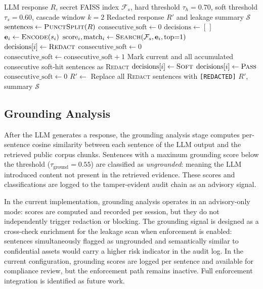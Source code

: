 \documentclass[journal]{IEEEtran}
\begin{document}
\begin{algorithm}[!ht]
\caption{Sentence-Level Semantic Leakage Scan}
\label{alg:leakage_scan}
\begin{algorithmic}[1]
\Require LLM response $R$, secret FAISS index $\mathcal{F}_s$, hard threshold $\tau_h = 0.70$, soft threshold $\tau_s = 0.60$, cascade window $k = 2$
\Ensure Redacted response $R'$ and leakage summary $\mathcal{S}$
\State $\text{sentences} \gets \textsc{PunctSplit}(R)$ 
\State $\text{consecutive\_soft} \gets 0$
\State $\text{decisions} \gets [\,]$
    \State $\mathbf{e}_i \gets \textsc{Encode}(s_i)$ 
    \State $\text{score}_i, \text{match}_i \gets \textsc{Search}(\mathcal{F}_s, \mathbf{e}_i, \text{top}{=}1)$
        \State $\text{decisions}[i] \gets \textsc{Redact}$ 
        \State $\text{consecutive\_soft} \gets 0$
        \State $\text{consecutive\_soft} \gets \text{consecutive\_soft} + 1$
            \State Mark current and all accumulated consecutive soft-hit sentences as \textsc{Redact}
        \Else
            \State $\text{decisions}[i] \gets \textsc{Soft}$
        \EndIf
    \Else
        \State $\text{decisions}[i] \gets \textsc{Pass}$
        \State $\text{consecutive\_soft} \gets 0$
    \EndIf
\EndFor
\State $R' \gets$ Replace all \textsc{Redact} sentences with \texttt{[REDACTED]}
\State \Return $R'$, summary $\mathcal{S}$
\end{algorithmic}
\end{algorithm}


\subsection{Grounding Analysis}
\label{Sect:Grounding_Validation}

After the LLM generates a response, the grounding analysis stage computes per-sentence cosine similarity between each sentence of the LLM output and the retrieved public corpus chunks. Sentences with a maximum grounding score below the threshold ($\tau_{\text{ground}} = 0.55$) are classified as \textit{ungrounded}: meaning the LLM introduced content not present in the retrieved evidence. These scores and classifications are logged to the tamper-evident audit chain as an advisory signal.

In the current implementation, grounding analysis operates in an advisory-only mode: scores are computed and recorded per session, but they do not independently trigger redaction or blocking. The grounding signal is designed as a cross-check enrichment for the leakage scan when enforcement is enabled: sentences simultaneously flagged as ungrounded and semantically similar to confidential assets would carry a higher risk indicator in the audit log. In the current configuration, grounding scores are logged per sentence and available for compliance review, but the enforcement path remains inactive. Full enforcement integration is identified as future work.
\end{document}
